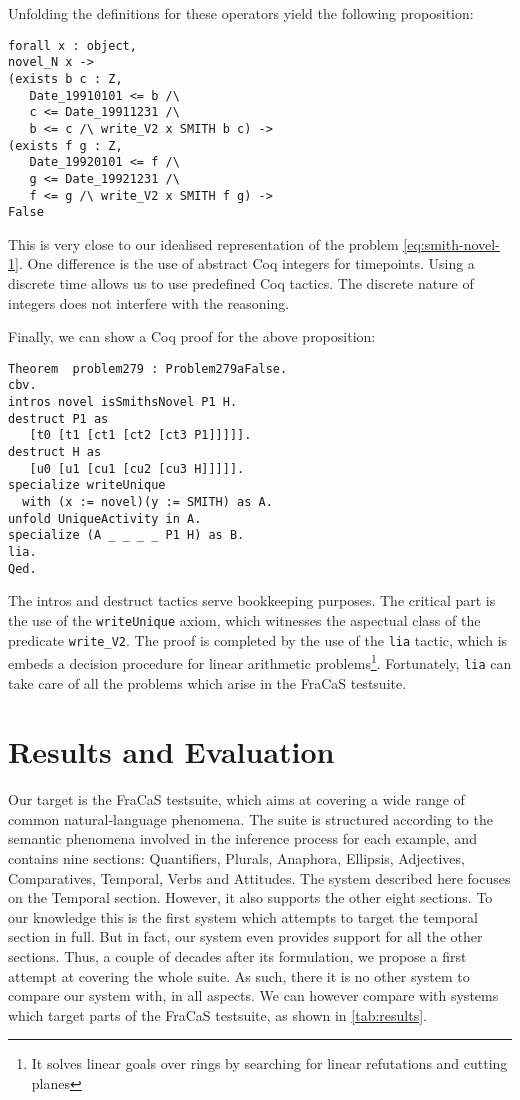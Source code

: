 \documentclass[11pt,a4paper]{article}
\begin{document}
Unfolding the definitions for these operators yield the following
proposition:
{\small
\begin{verbatim}
forall x : object,
novel_N x ->
(exists b c : Z,
   Date_19910101 <= b /\
   c <= Date_19911231 /\
   b <= c /\ write_V2 x SMITH b c) ->
(exists f g : Z,
   Date_19920101 <= f /\
   g <= Date_19921231 /\
   f <= g /\ write_V2 x SMITH f g) ->
False
\end{verbatim}
}This is very close to our idealised representation of the problem
\cref{eq:smith-novel-1}. One difference is the use of abstract Coq
integers for timepoints. Using a discrete time allows us to use
predefined Coq tactics. The discrete nature of integers does not
interfere with the reasoning.

Finally, we can show a Coq proof for the above proposition:
{\small
\begin{verbatim}
Theorem  problem279 : Problem279aFalse.
cbv.
intros novel isSmithsNovel P1 H.
destruct P1 as
   [t0 [t1 [ct1 [ct2 [ct3 P1]]]]].
destruct H as
   [u0 [u1 [cu1 [cu2 [cu3 H]]]]].
specialize writeUnique
  with (x := novel)(y := SMITH) as A.
unfold UniqueActivity in A.
specialize (A _ _ _ _ P1 H) as B.
lia.
Qed.
\end{verbatim}
}

The intros and destruct tactics serve bookkeeping purposes. The
critical part is the use of the \texttt{writeUnique} axiom, which
witnesses the aspectual class of the predicate \texttt{write\_V2}.
The proof is completed by the use of the \texttt{lia} tactic, which is
embeds a decision procedure for linear arithmetic problems\footnote{It
  solves linear goals over rings by searching for linear refutations
  and cutting planes}. Fortunately, \texttt{lia} can take care of all
the problems which arise in the FraCaS testsuite.


\section{Results and Evaluation}
\label{sec:results}
Our target is the FraCaS testsuite, which aims at covering a wide
range of common natural-language phenomena. 
%
The suite is structured according to the semantic phenomena involved
in the inference process for each example, and contains nine sections:
Quantifiers, Plurals, Anaphora, Ellipsis, Adjectives, Comparatives,
Temporal, Verbs and Attitudes.  The system described here focuses on
the Temporal section. However, it also supports the other eight
sections.  To our knowledge this is the first system which attempts to
target the temporal section in full. But in fact, our system even provides
support for all the other sections. Thus, a couple of decades after its
formulation, we propose a first attempt at covering the whole suite.
As such, there it is no other system to compare our system with, in
all aspects.  We can however compare with systems which target parts
of the FraCaS testsuite, as shown in \cref{tab:results}.
\end{document}
